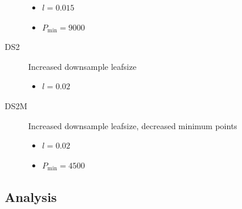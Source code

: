 \documentclass[11pt,a4paper]{kth-mag}
\begin{document}
\begin{description}
\begin{itemize}
  \item $l=0.015$
  \item $P_{\min}=9000$
  \end{itemize}
\item[DS2] Increased downsample leafsize
  \begin{itemize}
  \item $l=0.02$
  \end{itemize}
\item[DS2M] Increased downsample leafsize, decreased minimum points
  \begin{itemize}
  \item $l=0.02$
  \item $P_{\min}=4500$
  \end{itemize}
\end{description}
\subsection{Analysis}
\end{document}

